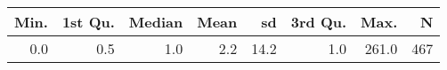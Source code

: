 \begin{table}[ht]
\centering
\begin{tabular}{rrrrrrrr}
  \hline
Min. & 1st Qu. & Median & Mean & sd & 3rd Qu. & Max. & N \\ 
  \hline
0.0 & 0.5 & 1.0 & 2.2 & 14.2 & 1.0 & 261.0 & 467 \\ 
   \hline
\end{tabular}
\end{table}
